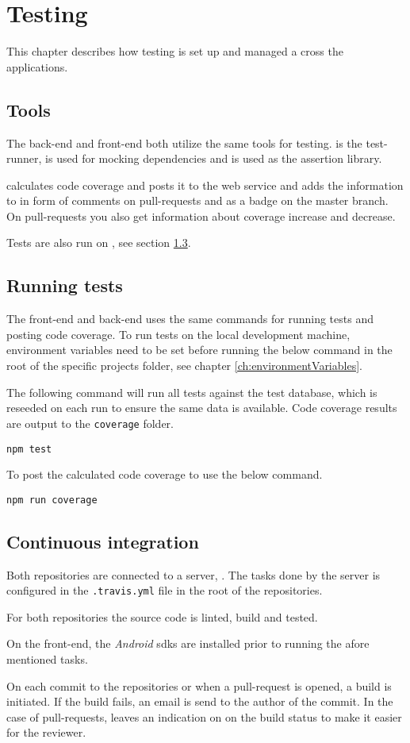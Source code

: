\chapter{Testing}
This chapter describes how testing is set up and managed a cross the applications.

\section{Tools}
The back-end and front-end both utilize the same tools for testing.
 is the test-runner,  is used for mocking dependencies and  is used as the assertion library.

 calculates code coverage and  posts it to the  web service and adds the information to  in form of comments on pull-requests and as a badge on the master branch.
On pull-requests you also get information about coverage increase and decrease.

Tests are also run on , see section \ref{sec:ci}.

\section{Running tests}
The front-end and back-end uses the same commands for running tests and posting code coverage.
To run tests on the local development machine, environment variables need to be set before running the below command in the root of the specific projects folder, see chapter \ref{ch:environmentVariables}.

The following command will run all tests against the test database, which is reseeded on each run to ensure the same data is available.
Code coverage results are output to the \verb+coverage+ folder.

\verb+npm test+

To post the calculated code coverage to  use the below command.

\verb+npm run coverage+

\section{Continuous integration}
\label{sec:ci}
Both repositories are connected to a  server, .
The tasks done by the server is configured in the \verb+.travis.yml+ file in the root of the repositories.

For both repositories the source code is linted, build and tested.

On the front-end, the \textit{Android} \glspl{sdk} are installed prior to running the afore mentioned tasks.

On each commit to the repositories or when a pull-request is opened, a build is initiated.
If the build fails, an email is send to the author of the commit.
In the case of pull-requests,  leaves an indication on  on the build status to make it easier for the reviewer.

